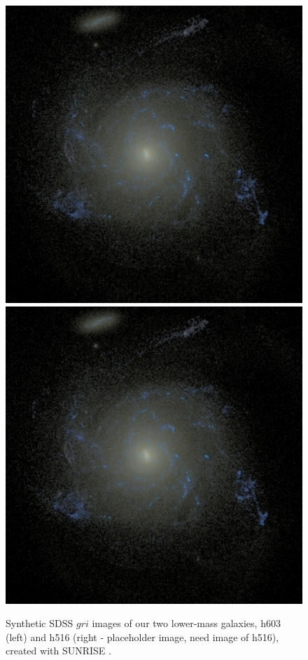 \documentclass[nofootinbib,twocolumn,prd]{emulateapj}
\begin{document}
\begin{figure}
\includegraphics[width=\columnwidth]{Figures/dwarf1}
\includegraphics[width=\columnwidth]{Figures/dwarf1}
\caption{\label{fig:GalaxyImages}Synthetic SDSS $gri$ images of our two lower-mass galaxies, h603 (left) and h516 (right - placeholder image, need image of h516), created with \textsc{SUNRISE} \citep{Jonsson06}.
\label{fig:dwarfimages}
}
\end{figure}
\end{document}
